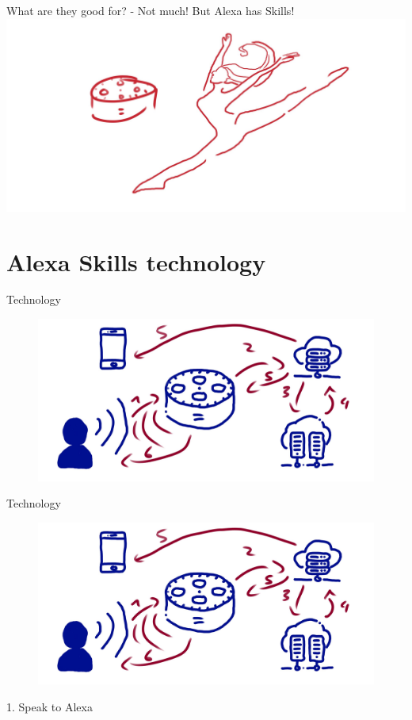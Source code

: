 \documentclass[aspectratio=169]{beamer}
\begin{document}
 \begin{frame}{What are they good for? - Not much!}
 \centering
 	 	But Alexa has Skills!
 	 	\includegraphics[width=0.8\linewidth]{images/alexadance}
\end{frame}

\section{Alexa Skills technology}
\begin{frame}{Technology}
	\begin{figure}
		\includegraphics[width=1\linewidth]{images/alexatech}
	\end{figure}
\end{frame}

\begin{frame}{Technology}
\begin{figure}
	\includegraphics[width=0.9\linewidth]{images/alexatech}
\end{figure}
1. Speak to Alexa
\end{frame}
\end{document}
